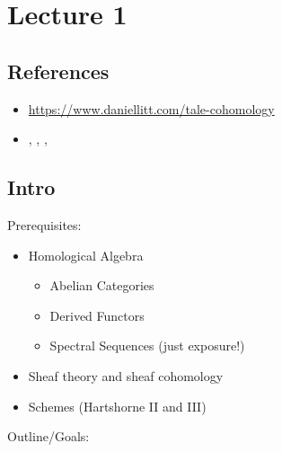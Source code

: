 \newpage

\tableofcontents
\newpage

\hypertarget{lecture-1}{%
\section{Lecture 1}\label{lecture-1}}

\hypertarget{references}{%
\subsection{References}\label{references}}

\begin{itemize}
\tightlist
\item
  \url{https://www.daniellitt.com/tale-cohomology}
\item
  \autocite{milneLEC}, \autocite{milne_2017},
  \autocite{freitag_kiehl_2013}, \autocite{katz}
\end{itemize}

\hypertarget{intro}{%
\subsection{Intro}\label{intro}}

Prerequisites:

\begin{itemize}
\tightlist
\item
  Homological Algebra

  \begin{itemize}
  \tightlist
  \item
    Abelian Categories
  \item
    Derived Functors
  \item
    Spectral Sequences (just exposure!)
  \end{itemize}
\item
  Sheaf theory and sheaf cohomology
\item
  Schemes (Hartshorne II and III)
\end{itemize}

Outline/Goals:


